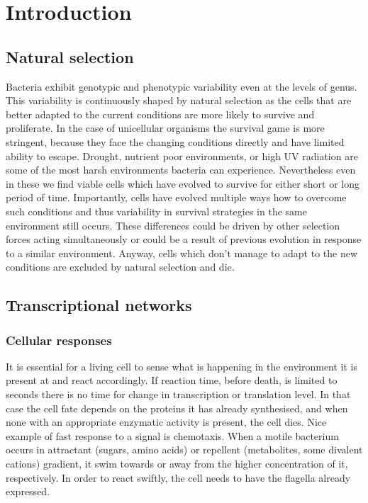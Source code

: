 \chapter{Introduction}
\setcounter{page}{1}


\shorthandoff{-} 
\section{Natural selection}
Bacteria exhibit genotypic and phenotypic variability even at the levels of genus.
This variability is continuously shaped by natural selection as the cells that are better adapted to the current conditions are more likely to survive and proliferate.
In the case of unicellular organisms the survival game is more stringent, because they face the changing conditions directly and have limited ability to escape.
Drought, nutrient poor environments, or high UV radiation are some of the most harsh environments bacteria can experience.
Nevertheless even in these we find viable cells which have evolved to survive for either short or long period of time.
Importantly, cells have evolved multiple ways how to overcome such conditions and thus variability in survival strategies in the same environment still occurs.
These differences could be driven by other selection forces acting simultaneously or could be a result of previous evolution in response to a similar environment.
Anyway, cells which don't manage to adapt to the new conditions are excluded by natural selection and die.


\section{Transcriptional networks}

\subsection{Cellular responses}
It is essential for a living cell to sense what is happening in the environment it is present at and react accordingly.
If reaction time, before death, is limited to seconds there is no time for change in transcription or translation level.
In that case the cell fate depends on the proteins it has already synthesised, and when none with an appropriate enzymatic activity is present, the cell dies.
Nice example of fast response to a signal is chemotaxis.
When a motile bacterium occurs in attractant (sugars, amino acids) or repellent (metabolites, some divalent cations) gradient, it swim towards or away from the higher concentration of it, respectively.
In order to react swiftly, the cell needs to have the flagella already expressed.


